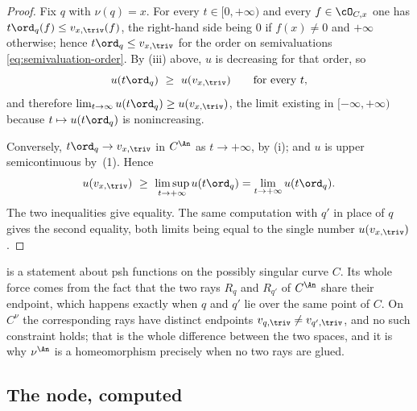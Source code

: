 \begin{proof}
Fix $q$ with $\nu(q)=x$.  For every $t\in[0,+\infty)$ and every
$f\in\cO_{C,x}$ one has $t\ord_q(f)\le v_{x,\triv}(f)$, the right-hand
side being $0$ if $f(x)\ne0$ and $+\infty$ otherwise; hence
$t\ord_q\le v_{x,\triv}$ for the order on semivaluations
\eqref{eq:semivaluation-order}.  By (iii) above, $u$ is decreasing for
that order, so
\[
 u(t\ord_q)\ \ge\ u(v_{x,\triv})
 \qquad\text{for every }t,
\]
and therefore $\lim_{t\to\infty}u(t\ord_q)\ge u(v_{x,\triv})$, the limit
existing in $[-\infty,+\infty)$ because $t\mapsto u(t\ord_q)$ is
nonincreasing.

Conversely, $t\ord_q\to v_{x,\triv}$ in $C^{\An}$ as $t\to+\infty$, by
(i); and $u$ is upper semicontinuous by \,(1).  Hence
\[
 u(v_{x,\triv})\ \ge\ \limsup_{t\to+\infty}u(t\ord_q)
 =\lim_{t\to+\infty}u(t\ord_q).
\]
The two inequalities give equality.  The same computation with $q'$ in
place of $q$ gives the second equality, both limits being equal to the
single number $u(v_{x,\triv})$.
\end{proof}

\begin{remark}
\label{rem:ch45-branch-symmetry-scope}
 is a statement about psh functions on the
possibly singular curve $C$.  Its whole force comes from the fact that the
two rays $R_q$ and $R_{q'}$ of $C^{\An}$ share their endpoint, which
happens exactly when $q$ and $q'$ lie over the same point of $C$.  On
$C^\nu$ the corresponding rays have distinct endpoints
$v_{q,\triv}\ne v_{q',\triv}$, and no such constraint holds; that is the
whole difference between the two spaces, and it is why $\nu^{\An}$ is a
homeomorphism precisely when no two rays are glued.
\end{remark}

\subsection{The node, computed}
\label{sec:ch45-node}

